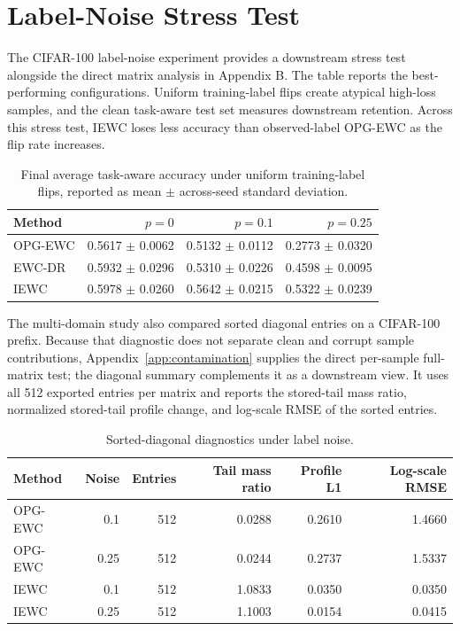 \section{Label-Noise Stress Test}
\label{app:label-noise}

The CIFAR-100 label-noise experiment provides a downstream stress test alongside the direct matrix analysis in Appendix B. The table reports the best-performing configurations. Uniform training-label flips create atypical high-loss samples, and the clean task-aware test set measures downstream retention. Across this stress test, IEWC loses less accuracy than observed-label OPG-EWC as the flip rate increases.

\begin{table}[H]
\caption{Final average task-aware accuracy under uniform training-label flips, reported as mean $\pm$ across-seed standard deviation.}
\label{tab:label-noise-performance}
\centering
\begin{tabular}{lrrr}
\toprule
Method & $p=0$ & $p=0.1$ & $p=0.25$ \\
\midrule
OPG-EWC & 0.5617 $\pm$ 0.0062 & 0.5132 $\pm$ 0.0112 & 0.2773 $\pm$ 0.0320 \\
EWC-DR & 0.5932 $\pm$ 0.0296 & 0.5310 $\pm$ 0.0226 & 0.4598 $\pm$ 0.0095 \\
IEWC & 0.5978 $\pm$ 0.0260 & 0.5642 $\pm$ 0.0215 & 0.5322 $\pm$ 0.0239 \\
\bottomrule
\end{tabular}
\end{table}

The multi-domain study also compared sorted diagonal entries on a CIFAR-100 prefix. Because that diagnostic does not separate clean and corrupt sample contributions, Appendix~\ref{app:contamination} supplies the direct per-sample full-matrix test; the diagonal summary complements it as a downstream view. It uses all 512 exported entries per matrix and reports the stored-tail mass ratio, normalized stored-tail profile change, and log-scale RMSE of the sorted entries.

\begin{table}[H]
\caption{Sorted-diagonal diagnostics under label noise.}
\label{tab:label-noise-diagonal-diagnostics}
\centering
\begin{tabular}{lrrrrr}
\toprule
Method & Noise & Entries & Tail mass ratio & Profile L1 & Log-scale RMSE \\
\midrule
OPG-EWC & 0.1 & 512 & 0.0288 & 0.2610 & 1.4660 \\
OPG-EWC & 0.25 & 512 & 0.0244 & 0.2737 & 1.5337 \\
IEWC & 0.1 & 512 & 1.0833 & 0.0350 & 0.0350 \\
IEWC & 0.25 & 512 & 1.1003 & 0.0154 & 0.0415 \\
\bottomrule
\end{tabular}
\end{table}

